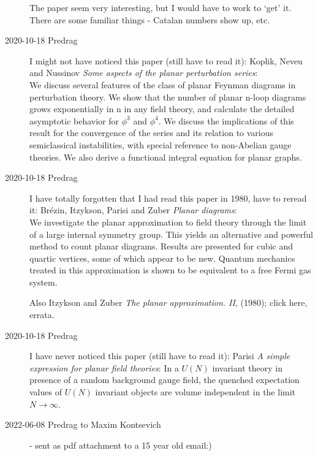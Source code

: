 \begin{description}
The paper seem very interesting, but I would have to work to `get' it. 
There are some familiar things - Catalan numbers show up, etc.

\item[2020-10-18 Predrag]
I might not have noticed this paper (still have to read it):
Koplik, Neveu and Nussinov
{{\em Some aspects of the planar perturbation series}}:\\
We discuss several features of the class of planar Feynman diagrams in
perturbation theory. We show that the number of planar n-loop diagrams
grows exponentially in n in any field theory, and calculate the detailed
asymptotic behavior for $\phi^3$ and $\phi^4$. We discuss the
implications of this result for the convergence of the series and its
relation to various semiclassical instabilities, with special reference
to non-Abelian gauge theories. We also derive a functional integral
equation for planar graphs.

\item[2020-10-18 Predrag]
I have totally forgotten that I had read this paper in 1980, have to
reread it:
Br{\'{e}}zin, Itzykson, Parisi and Zuber
{{\em Planar diagrams}}:\\
We investigate the planar approximation to field theory through the limit
of a large internal symmetry group. This yields an alternative and
powerful method to count planar diagrams. Results are presented for cubic
and quartic vertices, some of which appear to be new. Quantum mechanics
treated in this approximation is shown to be equivalent to a free Fermi
gas system.

Also
Itzykson and Zuber {\em The planar approximation. {II}},
(1980);
{click here},
 {errata}.

\item[2020-10-18 Predrag]
I have never noticed this paper (still have to read it):
Parisi
{{\em A simple expression for planar field theories}}:
In a $U(N)$ invariant theory in presence of a random background gauge
field, the quenched expectation values of $U(N)$ invariant objects are
volume independent in the limit $N\to\infty$.

\item[2022-06-08 Predrag to Maxim Kontsevich]
- sent as pdf attachment to a 15 year old email:)


\end{description}
